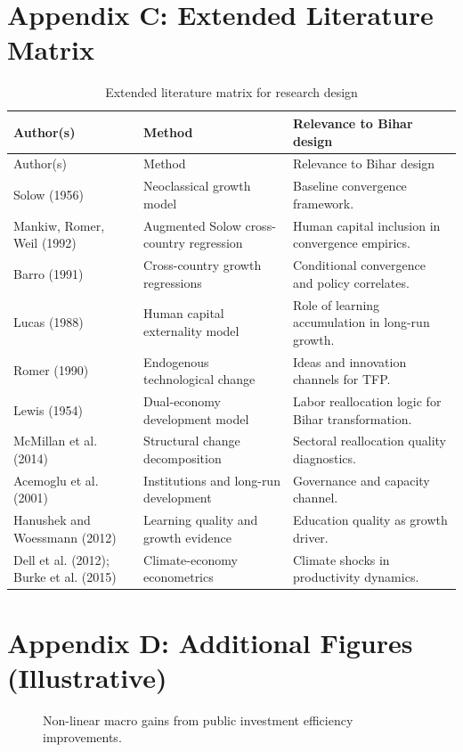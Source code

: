 \documentclass[preprint,12pt]{elsarticle}
\begin{document}
\section{Appendix C: Extended Literature Matrix}
\begin{longtable}{p{4.5cm}p{4cm}p{7cm}}
\caption{Extended literature matrix for research design}\label{tab:litmatrix}\\
\toprule
Author(s) & Method & Relevance to Bihar design \\
\midrule
\endfirsthead
\toprule
Author(s) & Method & Relevance to Bihar design \\
\midrule
\endhead
Solow (1956) & Neoclassical growth model & Baseline convergence framework. \\
Mankiw, Romer, Weil (1992) & Augmented Solow cross-country regression & Human capital inclusion in convergence empirics. \\
Barro (1991) & Cross-country growth regressions & Conditional convergence and policy correlates. \\
Lucas (1988) & Human capital externality model & Role of learning accumulation in long-run growth. \\
Romer (1990) & Endogenous technological change & Ideas and innovation channels for TFP.
\\
Lewis (1954) & Dual-economy development model & Labor reallocation logic for Bihar transformation.
\\
McMillan et al. (2014) & Structural change decomposition & Sectoral reallocation quality diagnostics.
\\
Acemoglu et al. (2001) & Institutions and long-run development & Governance and capacity channel.
\\
Hanushek and Woessmann (2012) & Learning quality and growth evidence & Education quality as growth driver.
\\
Dell et al. (2012); Burke et al. (2015) & Climate-economy econometrics & Climate shocks in productivity dynamics.
\\
\bottomrule
\end{longtable}

\section{Appendix D: Additional Figures (Illustrative)}
\begin{figure}[H]
\centering
{}
\caption{Non-linear macro gains from public investment efficiency improvements.}
\label{fig:eta}
\end{figure}
\end{document}
